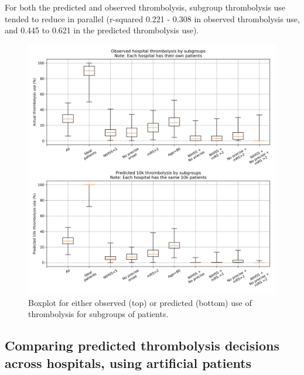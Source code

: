 \begin{itemize}
For both the predicted and observed thrombolysis, subgroup thrombolysis use tended to reduce in parallel (r-squared 0.221 - 0.308 in observed thrombolysis use, and 0.445 to 0.621 in the predicted thrombolysis use).

\begin{figure}
\centering
\includegraphics[width=1\textwidth]{./images/15a_actual_vs_modelled_subgroup_violin}
\caption{Boxplot for either observed (top) or predicted (bottom) use of thrombolysis for subgroups of patients.}
\label{fig:results_boxplot}
\end{figure}


\subsection{Comparing predicted thrombolysis decisions across hospitals, using artificial patients}


\end{itemize}
